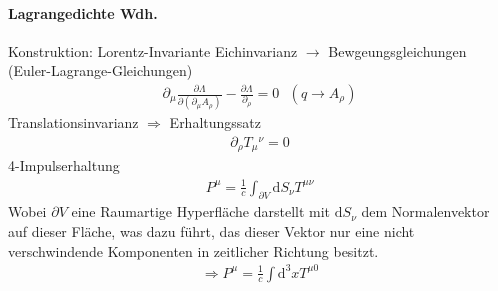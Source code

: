 \documentclass[a4paper]{article}
\begin{document}
\paragraph{Lagrangedichte Wdh.}
Konstruktion: Lorentz-Invariante
Eichinvarianz
$\rightarrow$ Bewgeungsgleichungen (Euler-Lagrange-Gleichungen)
\begin{align}
\partial_\mu \frac{\partial \Lambda}{\partial(\partial_\mu
A_\rho)}-\frac{\partial \Lambda}{\partial_\rho}=0 \text{    } (q\rightarrow
A_\rho)
\end{align}
Translationsinvarianz $\Rightarrow$ Erhaltungssatz
\begin{align}
\partial_\rho T_\mu{}^\nu=0
\end{align}
4-Impulserhaltung
\begin{align}
P^\mu=\frac{1}{c}\int_{\partial V} \mathrm{d}S_\nu T^{\mu\nu} 
\end{align}
Wobei $\partial V$ eine Raumartige Hyperfläche darstellt mit $\mathrm{d}S_\nu$ dem
Normalenvektor auf dieser Fläche, was dazu führt, das dieser Vektor nur eine
nicht verschwindende Komponenten in zeitlicher Richtung besitzt.
\begin{align}
\Rightarrow P^\mu=\frac{1}{c}\int \mathrm{d}^3x T^{\mu0}
\end{align}
\end{document}
